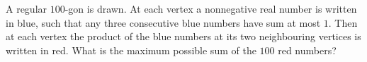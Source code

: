 A regular $100$-gon is drawn. At each vertex a nonnegative real number is written in blue, such that any three consecutive blue numbers have sum at most $1$. Then at each vertex the product of the blue numbers at its two neighbouring vertices is written in red. What is the maximum possible sum of the $100$ red numbers?
